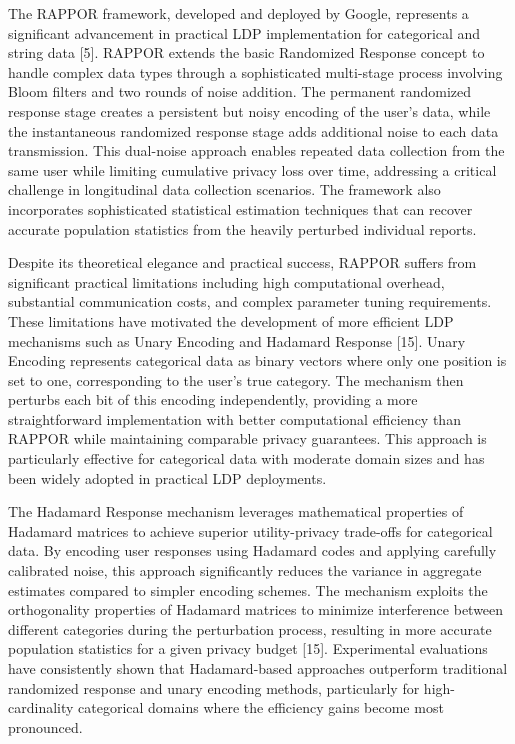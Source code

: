 \documentclass[conference]{IEEEtran}
\begin{document}
The RAPPOR framework, developed and deployed by Google, represents a significant advancement in practical LDP implementation for categorical and string data [5]. RAPPOR extends the basic Randomized Response concept to handle complex data types through a sophisticated multi-stage process involving Bloom filters and two rounds of noise addition. The permanent randomized response stage creates a persistent but noisy encoding of the user's data, while the instantaneous randomized response stage adds additional noise to each data transmission. This dual-noise approach enables repeated data collection from the same user while limiting cumulative privacy loss over time, addressing a critical challenge in longitudinal data collection scenarios. The framework also incorporates sophisticated statistical estimation techniques that can recover accurate population statistics from the heavily perturbed individual reports.

Despite its theoretical elegance and practical success, RAPPOR suffers from significant practical limitations including high computational overhead, substantial communication costs, and complex parameter tuning requirements. These limitations have motivated the development of more efficient LDP mechanisms such as Unary Encoding and Hadamard Response [15]. Unary Encoding represents categorical data as binary vectors where only one position is set to one, corresponding to the user's true category. The mechanism then perturbs each bit of this encoding independently, providing a more straightforward implementation with better computational efficiency than RAPPOR while maintaining comparable privacy guarantees. This approach is particularly effective for categorical data with moderate domain sizes and has been widely adopted in practical LDP deployments.

The Hadamard Response mechanism leverages mathematical properties of Hadamard matrices to achieve superior utility-privacy trade-offs for categorical data. By encoding user responses using Hadamard codes and applying carefully calibrated noise, this approach significantly reduces the variance in aggregate estimates compared to simpler encoding schemes. The mechanism exploits the orthogonality properties of Hadamard matrices to minimize interference between different categories during the perturbation process, resulting in more accurate population statistics for a given privacy budget [15]. Experimental evaluations have consistently shown that Hadamard-based approaches outperform traditional randomized response and unary encoding methods, particularly for high-cardinality categorical domains where the efficiency gains become most pronounced.
\end{document}
